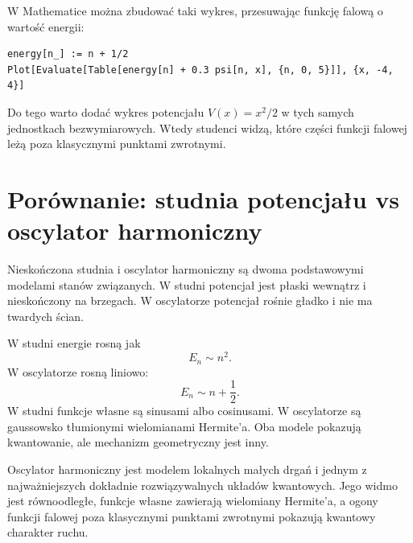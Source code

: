 W Mathematice można zbudować taki wykres, przesuwając funkcję falową o wartość energii:
\begin{verbatim}
energy[n_] := n + 1/2
Plot[Evaluate[Table[energy[n] + 0.3 psi[n, x], {n, 0, 5}]], {x, -4, 4}]
\end{verbatim}
Do tego warto dodać wykres potencjału \(V(x)=x^2/2\) w tych samych jednostkach bezwymiarowych. Wtedy studenci widzą, które części funkcji falowej leżą poza klasycznymi punktami zwrotnymi.

\section{Porównanie: studnia potencjału vs oscylator harmoniczny}

Nieskończona studnia i oscylator harmoniczny są dwoma podstawowymi modelami stanów związanych. W studni potencjał jest płaski wewnątrz i nieskończony na brzegach. W oscylatorze potencjał rośnie gładko i nie ma twardych ścian.

W studni energie rosną jak
\begin{equation}
    E_n\sim n^2.
\end{equation}
W oscylatorze rosną liniowo:
\begin{equation}
    E_n\sim n+\frac{1}{2}.
\end{equation}
W studni funkcje własne są sinusami albo cosinusami. W oscylatorze są gaussowsko tłumionymi wielomianami Hermite'a. Oba modele pokazują kwantowanie, ale mechanizm geometryczny jest inny.

\begin{summarybox}
Oscylator harmoniczny jest modelem lokalnych małych drgań i jednym z najważniejszych dokładnie rozwiązywalnych układów kwantowych. Jego widmo jest równoodległe, funkcje własne zawierają wielomiany Hermite'a, a ogony funkcji falowej poza klasycznymi punktami zwrotnymi pokazują kwantowy charakter ruchu.
\end{summarybox}
